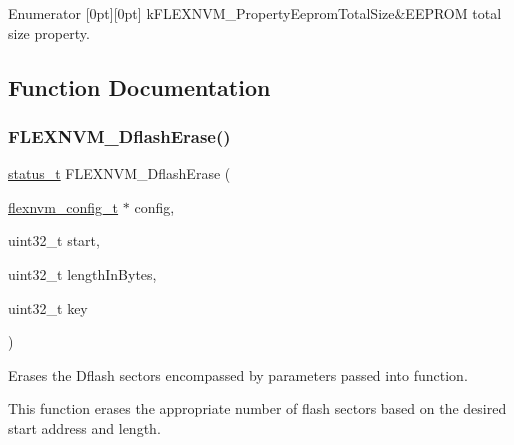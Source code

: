 \begin{DoxyEnumFields}{Enumerator}
[0pt][0pt]{}\mbox{\label{group__ftfx__flexnvm__driver_gga562d369144a5774490de42bfdd66c17ba75da70ae8381d84ee581cb7e6b8c77e6}} 
k\+F\+L\+E\+X\+N\+V\+M\+\_\+\+Property\+Eeprom\+Total\+Size&E\+E\+P\+R\+OM total size property. \\
\hline

\end{DoxyEnumFields}


\subsection{Function Documentation}
\mbox{\label{group__ftfx__flexnvm__driver_ga5fd0d2df3119387d00af533d11fa79bf}} 
\subsubsection{\texorpdfstring{FLEXNVM\_DflashErase()}{FLEXNVM\_DflashErase()}}
{\footnotesize\ttfamily \mbox{\hyperlink{group__ksdk__common_gaaabdaf7ee58ca7269bd4bf24efcde092}{status\+\_\+t}} F\+L\+E\+X\+N\+V\+M\+\_\+\+Dflash\+Erase (\begin{DoxyParamCaption}\item[{\mbox{\hyperlink{group__ftfx__flexnvm__driver_ga8fd4d473c0a4b30cac163160fb28a6c1}{flexnvm\+\_\+config\+\_\+t}} $\ast$}]{config,  }\item[{uint32\+\_\+t}]{start,  }\item[{uint32\+\_\+t}]{length\+In\+Bytes,  }\item[{uint32\+\_\+t}]{key }\end{DoxyParamCaption})}



Erases the Dflash sectors encompassed by parameters passed into function. 

This function erases the appropriate number of flash sectors based on the desired start address and length.


